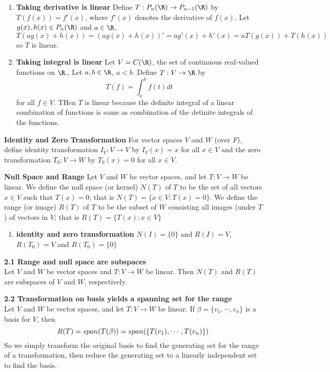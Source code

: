 \documentclass[11pt]{article}
\begin{document}
\begin{defn*}
\begin{enumerate}
        \item \textbf{Taking derivative is linear} Define $T:P_n(\R)\to P_{n-1}(\R)$ by $T(f(x))=f'(x)$, where $f'(x)$ denotes the derivative of $f(x)$. Let $g(x),h(x)\in P_n(\R)$ and $a\in \R$, 
        \[
            T(ag(x)+h(x)) = (ag(x)+h(x))' = ag'(x)+h'(x) = aT(g(x))+T(h(x))
        \]
        so $T$ is linear. 
        \item \textbf{Taking integral is linear} Let $V=C(\R)$, the set of continuous real-valued functions on $\R$., Let $a,b\in\R$, $a<b$. Define $T:V\to\R$ by 
        \[
            T(f) = \int_a^b f(t)dt     
        \]
        for all $f\in V$. THen $T$ is linear because the definite integral of a linear combination of functions is same as combination of the detinite integrals of the functions. 
    \end{enumerate}
\end{defn*}
    

\begin{defn*}
    \textbf{Identity and Zero Transformation} For vector spaces $V$ and $W$ (over $F$), define identity transformation $I_V:V\to V$ by $I_V(x)=x$ for all $x\in V$ and the zero transformation $T_0:V\to W$ by $T_0(x)=0$ for all $x\in V$. 
\end{defn*}

\begin{defn*}
    \textbf{Null Space and Range} Let $V$ and $W$ be vector spaces, and let $T:V\to W$ be linear. We define the null space (or kernel) $N(T)$ of $T$ to be the set of all vectors $x\in V$ such that $T(x) = 0$; that is $N(T) = \{x\in V: T(x)=0\}$. We define the range (or image) $R(T)$ of $T$ to be the subset of $W$ consisting all images (under $T$) of vectors in $V$; that is $R(T)=\{T(x):x\in V\}$
    \begin{enumerate}
        \item \textbf{identity and zero transformation} $N(I)=\{0\}$ and $R(I)=V$, $R(T_0)=V$ and $R(T_0)=\{0\}$
    \end{enumerate}
\end{defn*}

\begin{theorem*}
    \textbf{2.1 Range and null space are subspaces}\\ Let $V$ and $W$ be vector spaces and $T:V\to W$ be linear. Then $N(T)$ and $R(T)$ are subspaces of $V$ and $W$, respectively. 
\end{theorem*}

\begin{theorem*}
    \textbf{2.2 Transformation on basis yields a spanning set for the range} \\Let $V$ and $W$ be vector spaces, and let $T:V\to W$ be linear. If $\beta = \{v_1,\cdots,v_n \}$ is a basis for $V$, then 
    \[
        R(T) = span(T(\beta)) = span(\{T(v_1), \cdots, T(v_n)\})
    \]
    So we simply transform the original basis to find the generating set for the range of a transformation, then reduce the generating set to a linearly independent set to find the basis.
\end{theorem*}
\end{document}
